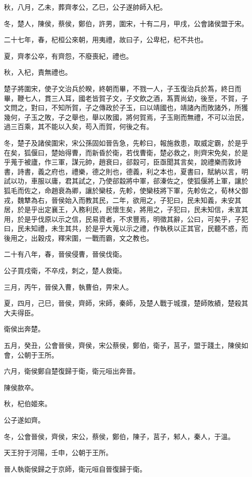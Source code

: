 \begin{pinyinscope}
秋，八月，乙未，葬齊孝公，乙巳，公子遂帥師入杞。

冬，楚人，陳侯，蔡侯，鄭伯，許男，圍宋，十有二月，甲戌，公會諸侯盟于宋。

二十七年，春，杞桓公來朝，用夷禮，故曰子，公卑杞，杞不共也。

夏，齊孝公卒，有齊怨，不廢喪紀，禮也。

秋，入杞，責無禮也。

楚子將圍宋，使子文治兵於睽，終朝而畢，不戮一人，子玉復治兵於蒍，終日而畢，鞭七人，貫三人耳，國老皆賀子文，子文飲之酒，蒍賈尚幼，後至，不賀，子文問之，對曰，不知所賀，子之傳政於子玉，曰以靖國也，靖諸內而敗諸外，所獲幾何，子玉之敗，子之舉也，舉以敗國，將何賀焉，子玉剛而無禮，不可以治民，過三百乘，其不能以入矣，苟入而賀，何後之有。

冬，楚子及諸侯圍宋，宋公孫固如晉告急，先軫曰，報施救患，取威定霸，於是乎在矣，狐偃曰，楚始得曹，而新昏於衛，若伐曹衛，楚必救之，則齊宋免矣，於是乎蒐于被廬，作三軍，謀元帥，趙衰曰，郤縠可，臣亟聞其言矣，說禮樂而敦詩書，詩書，義之府也，禮樂，德之則也，德義，利之本也，夏書曰，賦納以言，明試以功，車服以庸，君其試之，乃使郤縠將中軍，郤溱佐之，使狐偃將上軍，讓於狐毛而佐之，命趙衰為卿，讓於欒枝，先軫，使欒枝將下軍，先軫佐之，荀林父御戎，魏犨為右，晉侯始入而教其民，二年，欲用之，子犯曰，民未知義，未安其居，於是乎出定襄王，入務利民，民懷生矣，將用之，子犯曰，民未知信，未宣其用，於是乎伐原以示之信，民易資者，不求豐焉，明徵其辭，公曰，可矣乎，子犯曰，民未知禮，未生其共，於是乎大蒐以示之禮，作執秩以正其官，民聽不惑，而後用之，出穀戍，釋宋圍，一戰而霸，文之教也。

二十有八年，春，晉侯侵曹，晉侯伐衛。

公子買戍衛，不卒戍，刺之，楚人救衛。

三月，丙午，晉侯入曹，執曹伯，畀宋人。

夏，四月，己巳，晉侯，齊師，宋師，秦師，及楚人戰于城濮，楚師敗績，楚殺其大夫得臣。

衛侯出奔楚。

五月，癸丑，公會晉侯，齊侯，宋公蔡侯，鄭伯，衛子，莒子，盟于踐土，陳侯如會，公朝于王所。

六月，衛侯鄭自楚復歸于衛，衛元咺出奔晉。

陳侯款卒。

秋，杞伯姬來。

公子遂如齊。

冬，公會晉侯，齊侯，宋公，蔡侯，鄭伯，陳子，莒子，邾人，秦人，于溫。

天王狩于河陽，壬申，公朝于王所。

晉人執衛侯歸之于京師，衛元咺自晉復歸于衛。


\end{pinyinscope}
